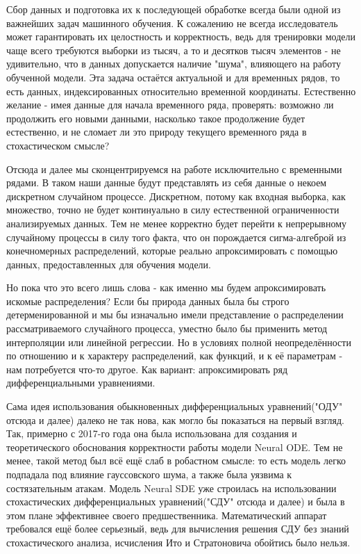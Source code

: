 \documentclass{article}
\begin{document}
   \par Сбор данных и подготовка их к последующей обработке всегда были одной из важнейших задач машинного обучения. К сожалению не всегда исследователь может гарантировать их целостность и корректность, ведь для тренировки модели чаще всего требуются выборки из тысяч, а то и десятков тысяч элементов - не удивительно, что в данных допускается наличие "шума", влияющего на работу обученной модели. Эта задача остаётся актуальной и для временных рядов, то есть данных, индексированных относительно временной координаты. Естественно желание - имея данные для начала временного ряда, проверять: возможно ли продолжить его новыми данными, насколько такое продолжение будет естественно, и не сломает ли это природу текущего временного ряда в стохастическом смысле?
   \par Отсюда и далее мы сконцентрируемся на работе исключительно с временными рядами. В таком наши данные будут представлять из себя данные о некоем дискретном случайном процессе. Дискретном, потому как входная выборка, как множество, точно не будет континуально в силу естественной ограниченности анализируемых данных. Тем не менее корректно будет перейти к непрерывному случайному процессы в силу того факта, что он порождается сигма-алгеброй из конечномерных распределений, которые реально апроксимировать с помощью данных, предоставленных для обучения модели.
   \par Но пока что это всего лишь слова - как именно мы будем апроксимировать искомые распределения? Если бы природа данных была бы строго детерменированной и мы бы изначально имели представление о распределении рассматриваемого случайного процесса, уместно было бы применить метод интерполяции или линейной регрессии. Но в условиях полной неопределённости по отношению и к характеру распределений, как функций, и к её параметрам - нам потребуется что-то другое. Как вариант: апроксимировать ряд дифференциальными уравнениями.
   \par Сама идея использования обыкновенных дифференциальных уравнений("ОДУ" отсюда и далее) далеко не так нова, как могло бы показаться на первый взгляд. Так, примерно с 2017-го года она была использована для создания и теоретического обоснования корректности работы модели Neural ODE. Тем не менее, такой метод был всё ещё слаб в робастном смысле: то есть модель легко подпадала под влияние гауссовского шума, а также была уязвима к состязательным атакам. Модель Neural SDE уже строилась на использовании стохастических дифференциальных уравнений("СДУ" отсюда и далее) и была в этом плане эффективнее своего предшественника. Математический аппарат требовался ещё более серьезный, ведь для вычисления решения СДУ без знаний стохастического анализа, исчисления Ито и Стратоновича обойтись было нельзя.
\end{document}
